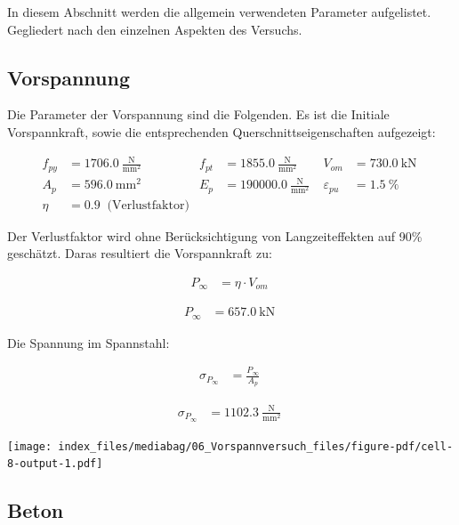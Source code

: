 \documentclass[
  11pt,
  letterpaper,
]{scrreprt}
\begin{document}
In diesem Abschnitt werden die allgemein verwendeten Parameter
aufgelistet. Gegliedert nach den einzelnen Aspekten des Versuchs.

\subsection{Vorspannung}\label{vorspannung}

Die Parameter der Vorspannung sind die Folgenden. Es ist die Initiale
Vorspannkraft, sowie die entsprechenden Querschnittseigenschaften
aufgezeigt:

$$
\begin{aligned}
f_{py} &= 1706.0\ \frac{\mathrm{N}}{\mathrm{mm}^{2}} \; 
 &f_{pt} &= 1855.0\ \frac{\mathrm{N}}{\mathrm{mm}^{2}} \; 
 &V_{om} &= 730.0\ \mathrm{kN} \; 
\\[10pt]
 A_{p} &= 596.0\ \mathrm{mm}^{2} \; 
 &E_{p} &= 190000.0\ \frac{\mathrm{N}}{\mathrm{mm}^{2}} \; 
 &\varepsilon_{pu} &= 1.5\ \mathrm{\%} \; 
\\[10pt]
 \eta &= 0.9 \; \;\textrm{(Verlustfaktor)}
\end{aligned}
$$

Der Verlustfaktor wird ohne Berücksichtigung von Langzeiteffekten auf
90\% geschätzt. Daras resultiert die Vorspannkraft zu:

$$
\begin{aligned}
P_{\infty} &= \eta \cdot V_{om} \; 
\end{aligned}
$$

$$
\begin{aligned}
P_{\infty} &= 657.0\ \mathrm{kN} \;
\end{aligned}
$$

Die Spannung im Spannstahl:

$$
\begin{aligned}
\sigma_{P_{\infty}} &= \frac{ P_{\infty} }{ A_{p} } \; 
\end{aligned}
$$

$$
\begin{aligned}
\sigma_{P_{\infty}} &= 1102.3\ \frac{\mathrm{N}}{\mathrm{mm}^{2}} \;
\end{aligned}
$$

\texttt{[image: index\_files/mediabag/06\_Vorspannversuch\_files/figure-pdf/cell-8-output-1.pdf]}

\subsection{Beton}\label{beton}
\end{document}
